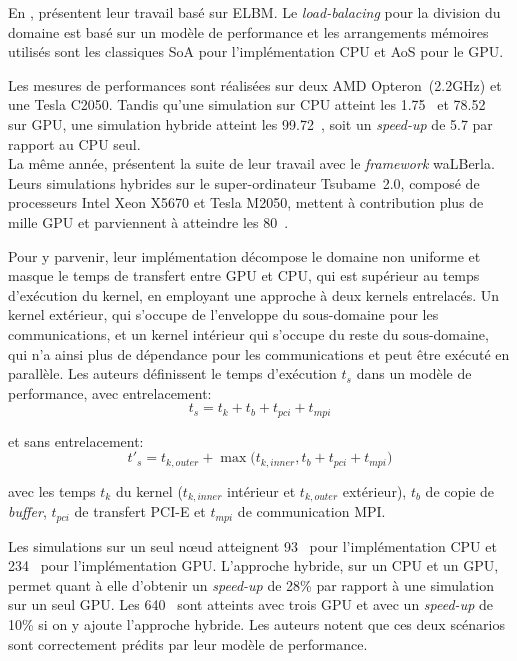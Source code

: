 En \citeyear{ye_parallel_2015}, \citet{ye_parallel_2015} présentent leur travail basé sur \ac{ELBM}. Le \textit{load-balacing} pour la division du domaine est basé sur un modèle de performance et les arrangements mémoires utilisés sont les classiques \acs{SoA} pour l'implémentation \acs{CPU} et \acs{AoS} pour le \acs{GPU}.

Les mesures de performances sont réalisées sur deux AMD Opteron\texttrademark~(2.2GHz) et une Tesla C2050. Tandis qu'une simulation sur \acs{CPU} atteint les 1.75~ et 78.52~ sur \acs{GPU}, une simulation hybride atteint les 99.72~, soit un \textit{speed-up} de 5.7 par rapport au \acs{CPU} seul.\\

La même année, \citet{feichtinger_performance_2015} présentent la suite de leur travail avec le \textit{framework} waLBerla. Leurs simulations hybrides sur le super-ordinateur Tsubame~2.0, composé de processeurs Intel Xeon X5670 et Tesla M2050, mettent à contribution plus de mille \acs{GPU} et parviennent à atteindre les 80~.

Pour y parvenir, leur implémentation décompose le domaine non uniforme et masque le temps de transfert entre \acs{GPU} et \acs{CPU}, qui est supérieur au temps d'exécution du kernel, en employant une approche à deux kernels entrelacés. Un kernel extérieur, qui s'occupe de l'enveloppe du sous-domaine pour les communications, et un kernel intérieur qui s'occupe du reste du sous-domaine, qui n'a ainsi plus de dépendance pour les communications et peut être exécuté en parallèle. Les auteurs définissent le temps d'exécution $t_s$ dans un modèle de performance, avec entrelacement:
\begin{equation}
t_s = t_k + t_b + t_{pci} + t_{mpi}
\end{equation}

\noindent et sans entrelacement:
\begin{equation}
t'_s = t_{k,outer} + \max\Big(t_{k,inner}, t_b + t_{pci} + t_{mpi}\Big)
\end{equation}

\noindent avec les temps $t_k$ du kernel ($t_{k,inner}$ intérieur et $t_{k,outer}$ extérieur), $t_b$ de copie de \textit{buffer}, $t_{pci}$ de transfert PCI-E et $t_{mpi}$ de communication MPI.

Les simulations sur un seul nœud atteignent 93~ pour l'implémentation \acs{CPU} et 234~ pour l'implémentation \acs{GPU}. L'approche hybride, sur un \acs{CPU} et un \acs{GPU}, permet quant à elle d'obtenir un \textit{speed-up} de 28\% par rapport à une simulation sur un seul \acs{GPU}. Les 640~ sont atteints avec trois \acs{GPU} et avec un \textit{speed-up} de 10\% si on y ajoute l'approche hybride. Les auteurs notent que ces deux scénarios sont correctement prédits par leur modèle de performance.


